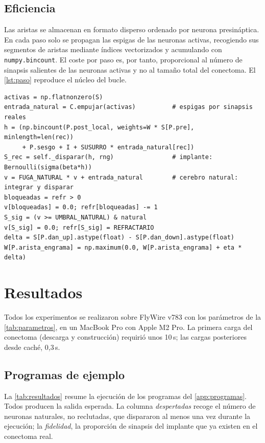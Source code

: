 \documentclass[11pt,a4paper]{article}
\theoremstyle{plain}
\theoremstyle{definition}
\theoremstyle{remark}
\begin{document}
\subsection{Eficiencia}

Las aristas se almacenan en formato disperso ordenado por neurona
presináptica. En cada paso solo se propagan las espigas de las neuronas
activas, recogiendo sus segmentos de aristas mediante índices vectorizados y
acumulando con \texttt{numpy.bincount}. El coste por paso es, por tanto,
proporcional al número de sinapsis salientes de las neuronas activas y no al
tamaño total del conectoma. El \cref{lst:paso} reproduce el núcleo del bucle.

\begin{lstlisting}[style=py,caption={Núcleo de un paso de simulación.},label={lst:paso}]
activas = np.flatnonzero(S)
entrada_natural = C.empujar(activas)          # espigas por sinapsis reales
h = (np.bincount(P.post_local, weights=W * S[P.pre], minlength=len(rec))
     + P.sesgo + I + SUSURRO * entrada_natural[rec])
S_rec = self._disparar(h, rng)                # implante: Bernoulli(sigma(beta*h))
v = FUGA_NATURAL * v + entrada_natural        # cerebro natural: integrar y disparar
bloqueadas = refr > 0
v[bloqueadas] = 0.0; refr[bloqueadas] -= 1
S_sig = (v >= UMBRAL_NATURAL) & natural
v[S_sig] = 0.0; refr[S_sig] = REFRACTARIO
delta = S[P.dan_up].astype(float) - S[P.dan_down].astype(float)
W[P.arista_engrama] = np.maximum(0.0, W[P.arista_engrama] + eta * delta)
\end{lstlisting}

\section{Resultados}
\label{sec:resultados}

Todos los experimentos se realizaron sobre FlyWire v783 con los parámetros de
la \cref{tab:parametros}, en un MacBook Pro con Apple M2 Pro. La primera carga
del conectoma (descarga y construcción) requirió unos 10\,s; las cargas
posteriores desde caché, 0,3\,s.

\subsection{Programas de ejemplo}

La \cref{tab:resultados} resume la ejecución de los programas del
\cref{app:programas}. Todos producen la salida esperada. La columna
\emph{despertadas} recoge el número de neuronas naturales, no reclutadas, que
dispararon al menos una vez durante la ejecución; la \emph{fidelidad}, la
proporción de sinapsis del implante que ya existen en el conectoma real.
\end{document}
